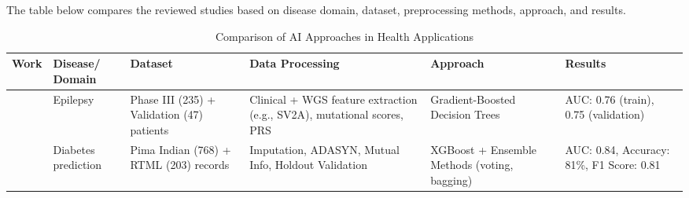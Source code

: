The table below compares the reviewed studies based on disease domain, dataset, preprocessing methods, approach, and results.
\begin{table}[htbp]
    \begin{adjustwidth}{-2cm}{-2cm} 
    \centering 
    \begin{tabular}{|p{1.5cm}|p{2.5cm}|p{3cm}|p{3.5cm}|p{2.5cm}|p{2.5cm}|}
    \hline
    \textbf{Work} & \textbf{Disease/ Domain} & \textbf{Dataset} & \textbf{Data Processing} & \textbf{Approach} & \textbf{Results} \\
    \hline
    \cite{article_1} & Epilepsy & Phase III (235) + Validation (47) patients & Clinical + WGS feature extraction (e.g., SV2A), mutational scores, PRS & Gradient-Boosted Decision Trees & AUC: 0.76 (train), 0.75 (validation) \\
    \hline
    \cite{article_2} & Diabetes prediction & Pima Indian (768) + RTML (203) records & Imputation, ADASYN, Mutual Info, Holdout Validation & XGBoost + Ensemble Methods (voting, bagging) & AUC: 0.84, Accuracy: 81\%, F1 Score: 0.81 \\
    \hline
    \end{tabular}
    \caption{Comparison of AI Approaches in Health Applications}
    \label{tab:ai_health_comparison}
    \end{adjustwidth}
\end{table}

 




